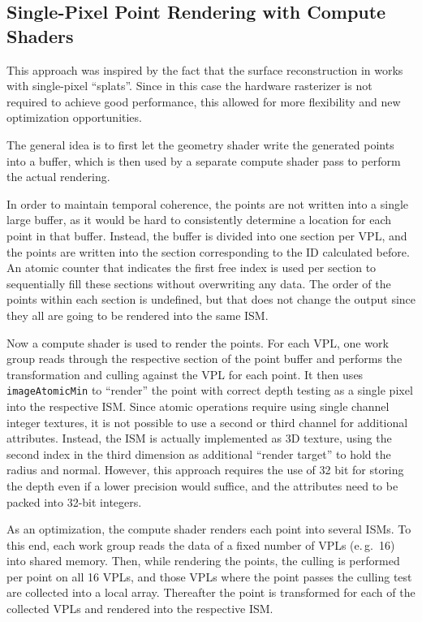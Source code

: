 \subsection{Single-Pixel Point Rendering with Compute Shaders}
\label{sec:impl:singlePixelRendering}

This approach was inspired by the fact that the surface reconstruction in \citet{Marroquim:2007:reconstruction} works with single-pixel ``splats''. Since in this case the hardware rasterizer is not required to achieve good performance, this allowed for more flexibility and new optimization opportunities.

The general idea is to first let the geometry shader write the generated points into a buffer, which is then used by a separate compute shader pass to perform the actual rendering.

In order to maintain temporal coherence, the points are not written into a single large buffer, as it would be hard to consistently determine a location for each point in that buffer. Instead, the buffer is divided into one section per VPL, and the points are written into the section corresponding to the ID calculated before. An atomic counter that indicates the first free index is used per section to sequentially fill these sections without overwriting any data. The order of the points within each section is undefined, but that does not change the output since they all are going to be rendered into the same ISM.

Now a compute shader is used to render the points. For each VPL, one work group reads through the respective section of the point buffer and performs the transformation and culling against the VPL for each point. It then uses \texttt{imageAtomicMin} to ``render'' the point with correct depth testing as a single pixel into the respective ISM. Since atomic operations require using single channel integer textures, it is not possible to use a second or third channel for additional attributes. Instead, the ISM is actually implemented as 3D texture, using the second index in the third dimension as additional ``render target'' to hold the radius and normal. However, this approach requires the use of 32 bit for storing the depth even if a lower precision would suffice, and the attributes need to be packed into 32-bit integers.


As an optimization, the compute shader renders each point into several ISMs. To this end, each work group reads the data of a fixed number of VPLs (e.\,g.\ 16) into shared memory. Then, while rendering the points, the culling is performed per point on all 16 VPLs, and those VPLs where the point passes the culling test are collected into a local array. Thereafter the point is transformed for each of the collected VPLs and rendered into the respective ISM.

